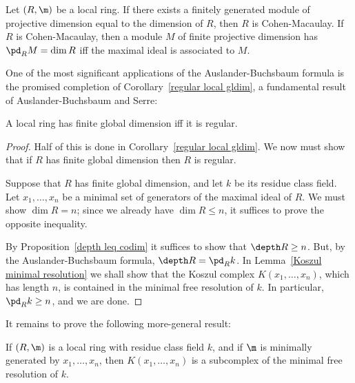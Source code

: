 \begin{corollary}
Let $(R,\m)$ be a local ring. If there exists a finitely generated module of projective dimension equal to the dimension of $R$, then $R$ is Cohen-Macaulay. If $R$ is Cohen-Macaulay, then a module $M$ of finite
projective dimension has $\pd_RM=\dim R$ iff the maximal ideal is associated to $M$.
\end{corollary}
One of the most significant applications of the Auslander-Buchsbaum
formula is the promised completion of Corollary~\ref{regular local gldim}, a fundamental result of Auslander-Buchsbaum and Serre:
\begin{theorem}\label{regular local iff gldim}
A local ring has finite global dimension iff it is regular.
\end{theorem}
\begin{proof}
Half of this is done in Corollary~\ref{regular local gldim}. We now must show that if $R$ has finite global dimension then $R$ is regular.\par
Suppose that $R$ has finite global dimension, and let $k$ be its residue class field. Let $x_1,\dots,x_n$ be a minimal set of generators of the maximal ideal of $R$. We must show $\dim R=n$; since we already have $\dim R\leq n$, it suffices to prove the opposite inequality.\par
By Proposition~\ref{depth leq codim} it suffices to show that $\depth R\geq n$. But, by the Auslander-Buchsbaum formula, $\depth R=\pd_Rk$. In Lemma~\ref{Koszul minimal resolution} we shall show that the Koszul complex $K(x_1,\dots,x_n)$, which has length $n$, is contained in the minimal free resolution of $k$. In particular, $\pd_Rk\geq n$, and we are done.
\end{proof}
It remains to prove the following more-general result:
\begin{lemma}\label{Koszul minimal resolution}
If $(R,\m)$ is a local ring with residue class field $k$, and if $\m$ is minimally generated by $x_1,\dots,x_n$, then $K(x_1,\dots,x_n)$ is a subcomplex of the minimal free resolution of $k$.
\end{lemma}
